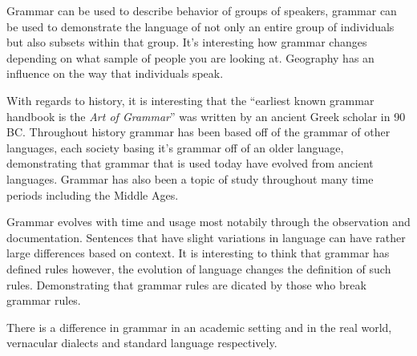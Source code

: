 \documentclass{article}
\begin{document}
Grammar can be used to describe behavior of groups of speakers, grammar can be used to demonstrate the language of not only an
entire group of individuals but also subsets within that group. It's interesting how grammar changes depending on what sample 
of people you are looking at. Geography has an influence on the way that individuals speak.
\medskip

With regards to history, it is interesting that the ``earliest known grammar handbook is the \textit{Art of Grammar}'' was written
by an ancient Greek scholar in 90 BC. Throughout history grammar has been based off of the grammar of other languages, each society
basing it's grammar off of an older language, demonstrating that grammar that is used today have evolved from ancient languages.
Grammar has also been a topic of study throughout many time periods including the Middle Ages.
\medskip

Grammar evolves with time and usage most notabily through the observation and documentation. Sentences that have slight variations in
language can have rather large differences based on context. It is interesting to think that grammar has defined rules however, the 
evolution of language changes the definition of such rules. Demonstrating that grammar rules are dicated by those who break grammar 
rules. 
\medskip

There is a difference in grammar in an academic setting and in the real world, vernacular dialects and standard language respectively.
\end{document}

